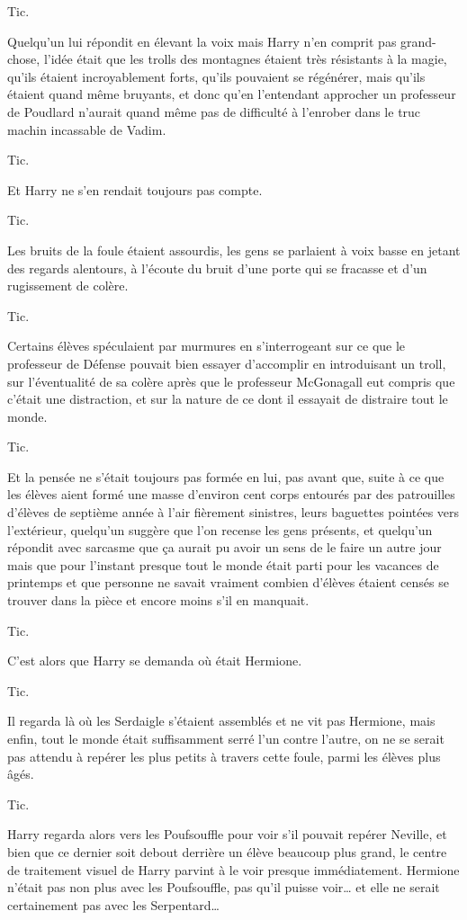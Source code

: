 Tic.

Quelqu'un lui répondit en élevant la voix mais Harry n'en comprit pas grand-chose, l'idée était que les trolls des montagnes étaient très résistants à la magie, qu'ils étaient incroyablement forts, qu'ils pouvaient se régénérer, mais qu'ils étaient quand même bruyants, et donc qu'en l'entendant approcher un professeur de Poudlard n'aurait quand même pas de difficulté à l'enrober dans le truc machin incassable de Vadim.

Tic.

Et Harry ne s'en rendait toujours pas compte.

Tic.

Les bruits de la foule étaient assourdis, les gens se parlaient à voix basse en jetant des regards alentours, à l'écoute du bruit d'une porte qui se fracasse et d'un rugissement de colère.

Tic.

Certains élèves spéculaient par murmures en s'interrogeant sur ce que le professeur de Défense pouvait bien essayer d'accomplir en introduisant un troll, sur l'éventualité de sa colère après que le professeur McGonagall eut compris que c'était une distraction, et sur la nature de ce dont il essayait de distraire tout le monde.

Tic.

Et la pensée ne s'était toujours pas formée en lui, pas avant que, suite à ce que les élèves aient formé une masse d'environ cent corps entourés par des patrouilles d'élèves de septième année à l'air fièrement sinistres, leurs baguettes pointées vers l'extérieur, quelqu'un suggère que l'on recense les gens présents, et quelqu'un répondit avec sarcasme que ça aurait pu avoir un sens de le faire un autre jour mais que pour l'instant presque tout le monde était parti pour les vacances de printemps et que personne ne savait vraiment combien d'élèves étaient censés se trouver dans la pièce et encore moins s'il en manquait.

Tic.

C'est alors que Harry se demanda où était Hermione.

Tic.

Il regarda là où les Serdaigle s'étaient assemblés et ne vit pas Hermione, mais enfin, tout le monde était suffisamment serré l'un contre l'autre, on ne se serait pas attendu à repérer les plus petits à travers cette foule, parmi les élèves plus âgés.

Tic.

Harry regarda alors vers les Poufsouffle pour voir s'il pouvait repérer Neville, et bien que ce dernier soit debout derrière un élève beaucoup plus grand, le centre de traitement visuel de Harry parvint à le voir presque immédiatement. Hermione n'était pas non plus avec les Poufsouffle, pas qu'il puisse voir… et elle ne serait certainement pas avec les Serpentard…


